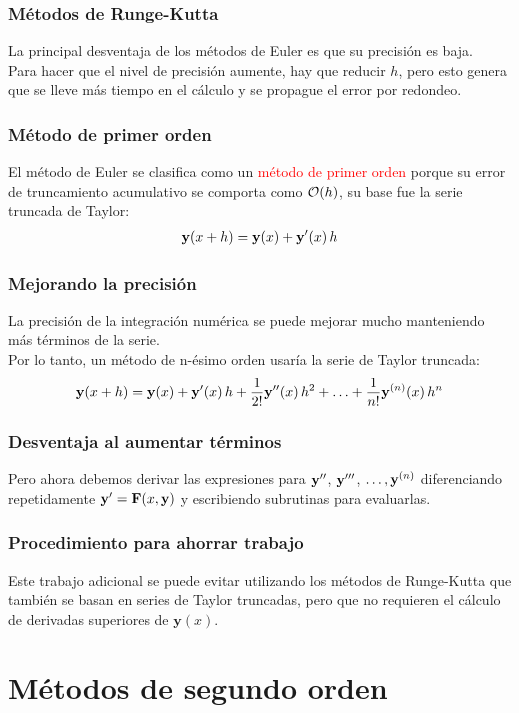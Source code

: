 \documentclass[12pt]{beamer}
\begin{document}
\begin{frame}
\frametitle{Métodos de Runge-Kutta}
La principal desventaja de los métodos de Euler es que su precisión es baja.
\\
\bigskip
\pause
Para hacer que el nivel de precisión aumente, hay que reducir $h$, pero esto genera que se lleve más tiempo en el cálculo y se propague el error por redondeo.
\end{frame}
\begin{frame}
\frametitle{Método de primer orden}
El método de Euler se clasifica como un \textcolor{red}{método de primer orden} porque su error de truncamiento acumulativo se comporta como $\order{h}$, \pause su base fue la serie truncada de Taylor:
\begin{align*}
\mathbf{y} (x + h) = \mathbf{y} (x) + {\mathbf{y}}^{\prime} (x) \, h
\end{align*}
\end{frame}
\begin{frame}
\frametitle{Mejorando la precisión}
La precisión de la integración numérica se puede mejorar mucho manteniendo más términos de la serie.
\\
\bigskip
\pause
Por lo tanto, un método de n-ésimo orden usaría la serie de Taylor truncada:
\begin{align*}
\mathbf{y} (x + h) = \mathbf{y} (x) + {\mathbf{y}}^{\prime} (x) \, h + \dfrac{1}{2!} {\mathbf{y}}^{\prime \prime} (x) \, h^{2} + \ldots + \dfrac{1}{n!} {\mathbf{y}}^{(n)} (x) \, h^{n} 
\end{align*}
\end{frame}
\begin{frame}
\frametitle{Desventaja al aumentar términos}
Pero ahora debemos derivar las expresiones para ${\mathbf{y}}^{\prime \prime}$, ${\mathbf{y}}^{\prime \prime \prime}$, $\ldots, {\mathbf{y}}^{(n)}$ diferenciando repetidamente ${\mathbf{y}}^{\prime} = \mathbf{F} (x, \mathbf{y})$ y escribiendo subrutinas para evaluarlas.
\end{frame}
\begin{frame}
\frametitle{Procedimiento para ahorrar trabajo}
Este trabajo adicional se puede evitar utilizando los \textcolor{ao(english)}{métodos de Runge-Kutta} \pause que también se basan en series de Taylor truncadas, pero que no requieren el cálculo de derivadas superiores de $\mathbf{y} (x)$.
\end{frame}

\section{Métodos de segundo orden}
\end{document}
